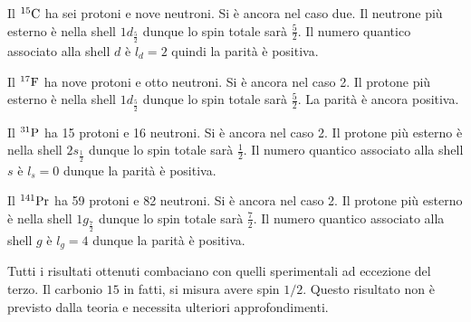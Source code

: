 \documentclass[../main.tex]{subfiles}
\begin{document}
\begin{svol}
		Il $ ^{15}\mathrm{C} $ ha sei protoni e nove neutroni. Si è ancora nel caso due. Il neutrone più esterno è nella shell $ 1d_{\frac{5}{2}} $ dunque lo spin totale sarà $ \frac{5}{2} $. Il numero quantico associato alla shell $ d $ è $ l_{d}=2 $ quindi la parità è positiva. 
		
		Il $ ^{17}\mathrm{F} $ ha nove protoni e otto neutroni. Si è ancora nel caso 2. Il protone più esterno è nella shell $ 1d_{\frac{5}{2}} $ dunque lo spin totale sarà $ \frac{5}{2} $. La parità è ancora positiva.
		
		Il $ ^{31}\mathrm{P} $ ha 15 protoni e 16 neutroni. Si è ancora nel caso 2. Il protone più esterno è nella shell $ 2s_{\frac{1}{2}} $ dunque lo spin totale sarà $ \frac{1}{2} $. Il numero quantico associato alla shell $ s $ è $ l_{s}=0 $ dunque la parità è positiva.
		
		Il $ ^{141}\mathrm{Pr} $ ha 59 protoni e 82 neutroni. Si è ancora nel caso 2. Il protone più esterno è nella shell $ 1g_{\frac{7}{2}} $ dunque lo spin totale sarà $ \frac{7}{2} $. Il numero quantico associato alla shell $ g $ è $ l_{g}=4 $ dunque la parità è positiva.
		
		Tutti i risultati ottenuti combaciano con quelli sperimentali ad eccezione del terzo. Il carbonio $ 15 $ in fatti, si misura avere spin $ 1/2 $. Questo risultato non è previsto dalla teoria e necessita ulteriori approfondimenti.
	\end{svol}
\end{document}
